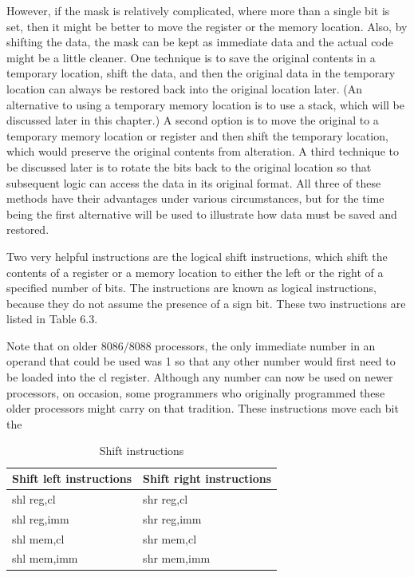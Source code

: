\documentclass[10pt]{book}
\begin{document}
However, if the mask is relatively complicated, where more than a single bit is set, then it might be better to move the register or the memory location. Also, by shifting the data, the mask can be kept as immediate data and the actual code might be a little cleaner. One technique is to save the original contents in a temporary location, shift the data, and then the original data in the temporary location can always be restored back into the original location later. (An alternative to using a temporary memory location is to use a stack, which will be discussed later in this chapter.) A second option is to move the original to a temporary memory location or register and then shift the temporary location, which would preserve the original contents from alteration. A third technique to be discussed later is to rotate the bits back to the original location so that subsequent logic can access the data in its original format. All three of these methods have their advantages under various circumstances, but for the time being the first alternative will be used to illustrate how data must be saved and restored.

Two very helpful instructions are the logical shift instructions, which shift the contents of a register or a memory location to either the left or the right of a specified number of bits. The instructions are known as logical instructions, because they do not assume the presence of a sign bit. These two instructions are listed in Table 6.3.

Note that on older $8086 / 8088$ processors, the only immediate number in an operand that could be used was 1 so that any other number would first need to be loaded into the cl register. Although any number can now be used on newer processors, on occasion, some programmers who originally programmed these older processors might carry on that tradition. These instructions move each bit the

\begin{table}[ht]
\centering
\caption{Shift instructions}
\begin{tabular}{ll}
\textbf{Shift left instructions} & \textbf{Shift right instructions} \\
\hline
shl reg,cl & shr reg,cl \\
shl reg,imm & shr reg,imm \\
shl mem,cl & shr mem,cl \\
shl mem,imm & shr mem,imm \\
\end{tabular}
\end{table}
\end{document}
